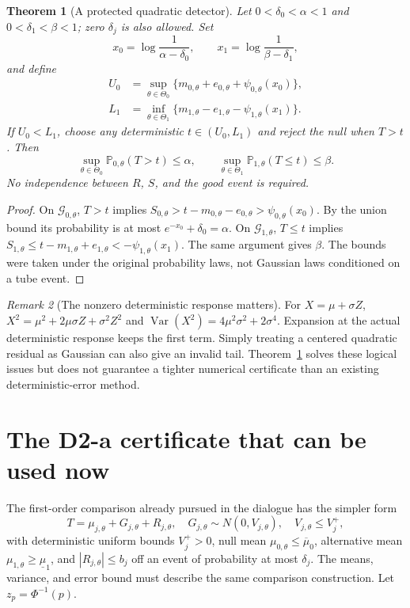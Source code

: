\documentclass[11pt]{article}
\newtheorem{theorem}{Theorem}
\theoremstyle{remark}\newtheorem{remark}[theorem]{Remark}
\newcommand{\Prob}{\mathbb P}
\begin{document}
\begin{theorem}[A protected quadratic detector]\label{thm:risk}
Let $0<\delta_0<\alpha<1$ and $0<\delta_1<\beta<1$; zero $\delta_j$ is also allowed. Set
\[
 x_0=\log\frac1{\alpha-\delta_0},\qquad
 x_1=\log\frac1{\beta-\delta_1},
\]
and define
\begin{align*}
 U_0&=\sup_{\theta\in\Theta_0}
       \{m_{0,\theta}+e_{0,\theta}+\psi_{0,\theta}(x_0)\},\\
 L_1&=\inf_{\theta\in\Theta_1}
       \{m_{1,\theta}-e_{1,\theta}-\psi_{1,\theta}(x_1)\}.
\end{align*}
If $U_0<L_1$, choose any deterministic $t\in(U_0,L_1)$ and reject the null when $T>t$. Then
\[
\sup_{\theta\in\Theta_0}\Prob_{0,\theta}(T>t)\le\alpha,
\qquad
\sup_{\theta\in\Theta_1}\Prob_{1,\theta}(T\le t)\le\beta.
\]
No independence between $R$, $S$, and the good event is required.
\end{theorem}

\begin{proof}
On $\mathcal G_{0,\theta}$, $T>t$ implies
$S_{0,\theta}>t-m_{0,\theta}-e_{0,\theta}>
\psi_{0,\theta}(x_0)$. By the union bound its probability is at most
$e^{-x_0}+\delta_0=\alpha$. On $\mathcal G_{1,\theta}$,
$T\le t$ implies $S_{1,\theta}\le t-m_{1,\theta}+e_{1,\theta}
<-\psi_{1,\theta}(x_1)$. The same argument gives $\beta$.
The bounds were taken under the original probability laws, not Gaussian laws conditioned on a tube event.
\end{proof}

\begin{remark}[The nonzero deterministic response matters]\label{rem:mean}
For $X=\mu+\sigma Z$, $X^2=\mu^2+2\mu\sigma Z+\sigma^2Z^2$ and
$\operatorname{Var}(X^2)=4\mu^2\sigma^2+2\sigma^4$. Expansion at the actual deterministic response keeps the first term. Simply treating a centered quadratic residual as Gaussian can also give an invalid tail. Theorem~\ref{thm:risk} solves these logical issues but does not guarantee a tighter numerical certificate than an existing deterministic-error method.
\end{remark}

\section{The D2-a certificate that can be used now}
The first-order comparison already pursued in the dialogue has the simpler form
\[
 T=\mu_{j,\theta}+G_{j,\theta}+R_{j,\theta},\quad
 G_{j,\theta}\sim N(0,V_{j,\theta}),\quad
 V_{j,\theta}\le V_j^+,
\]
with deterministic uniform bounds $V_j^+>0$, null mean
$\mu_{0,\theta}\le\overline\mu_0$, alternative mean
$\mu_{1,\theta}\ge\underline\mu_1$, and
$|R_{j,\theta}|\le b_j$ off an event of probability at most $\delta_j$.
The means, variance, and error bound must describe the same comparison construction. Let $z_p=\Phi^{-1}(p)$.
\end{document}
